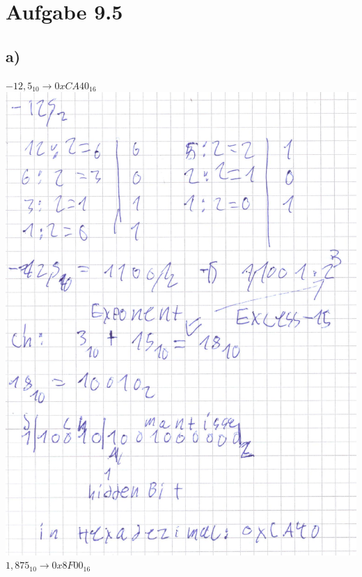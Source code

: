 \documentclass{article}
\begin{document}
	\section*{Aufgabe 9.5}
	\subsection*{a)}
	$-12,5_{10} \to 0xCA40_{16}$ \\
	\includegraphics{"95a1"} \\
	$1,875_{10} \to 0x8F00_{16}$ \\
\end{document}
